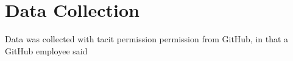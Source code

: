 \section{Data Collection}

Data was collected with tacit permission permission from GitHub, in that a GitHub employee said 